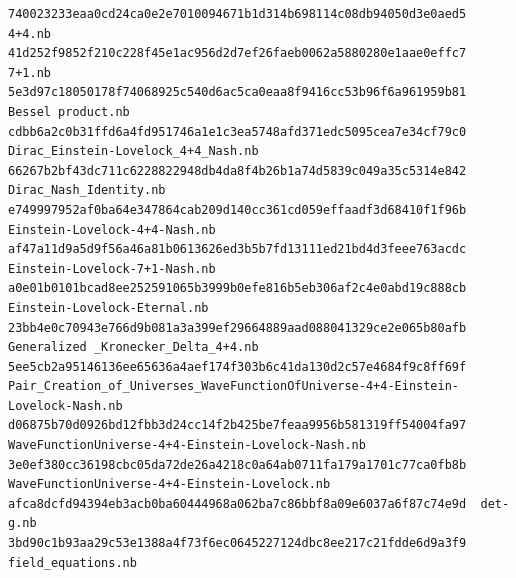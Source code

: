 \documentclass[
  10pt,
]{article}
\begin{document}
\begin{verbatim}
740023233eaa0cd24ca0e2e7010094671b1d314b698114c08db94050d3e0aed5  4+4.nb
41d252f9852f210c228f45e1ac956d2d7ef26faeb0062a5880280e1aae0effc7  7+1.nb
5e3d97c18050178f74068925c540d6ac5ca0eaa8f9416cc53b96f6a961959b81  Bessel product.nb
cdbb6a2c0b31ffd6a4fd951746a1e1c3ea5748afd371edc5095cea7e34cf79c0  Dirac_Einstein-Lovelock_4+4_Nash.nb
66267b2bf43dc711c6228822948db4da8f4b26b1a74d5839c049a35c5314e842  Dirac_Nash_Identity.nb
e749997952af0ba64e347864cab209d140cc361cd059effaadf3d68410f1f96b  Einstein-Lovelock-4+4-Nash.nb
af47a11d9a5d9f56a46a81b0613626ed3b5b7fd13111ed21bd4d3feee763acdc  Einstein-Lovelock-7+1-Nash.nb
a0e01b0101bcad8ee252591065b3999b0efe816b5eb306af2c4e0abd19c888cb  Einstein-Lovelock-Eternal.nb
23bb4e0c70943e766d9b081a3a399ef29664889aad088041329ce2e065b80afb  Generalized _Kronecker_Delta_4+4.nb
5ee5cb2a95146136ee65636a4aef174f303b6c41da130d2c57e4684f9c8ff69f  Pair_Creation_of_Universes_WaveFunctionOfUniverse-4+4-Einstein-Lovelock-Nash.nb
d06875b70d0926bd12fbb3d24cc14f2b425be7feaa9956b581319ff54004fa97  WaveFunctionUniverse-4+4-Einstein-Lovelock-Nash.nb
3e0ef380cc36198cbc05da72de26a4218c0a64ab0711fa179a1701c77ca0fb8b  WaveFunctionUniverse-4+4-Einstein-Lovelock.nb
afca8dcfd94394eb3acb0ba60444968a062ba7c86bbf8a09e6037a6f87c74e9d  det-g.nb
3bd90c1b93aa29c53e1388a4f73f6ec0645227124dbc8ee217c21fdde6d9a3f9  field_equations.nb
\end{verbatim}
\end{document}
